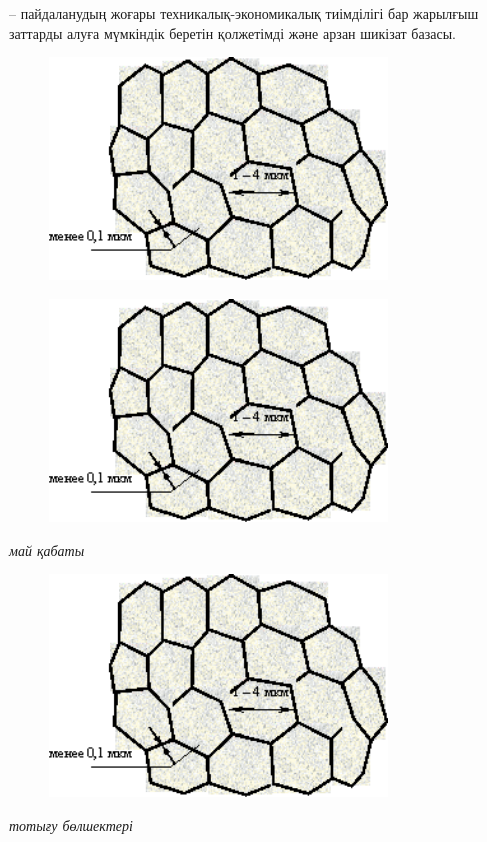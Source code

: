 -- пайдаланудың жоғары техникалық-экономикалық тиімділігі бар жарылғыш
заттарды алуға мүмкіндік беретін қолжетімді және арзан шикізат базасы.

\begin{figure}[H]
	\centering
	\includegraphics[width=0.8\textwidth]{assets/68}
	\caption*{}
\end{figure}

\begin{figure}[H]
	\centering
	\includegraphics[width=0.8\textwidth]{assets/68}
	\caption*{}
\end{figure}
\emph{май қабаты}
\begin{figure}[H]
	\centering
	\includegraphics[width=0.8\textwidth]{assets/68}
	\caption*{}
\end{figure}\emph{тотығу
бөлшектері}

